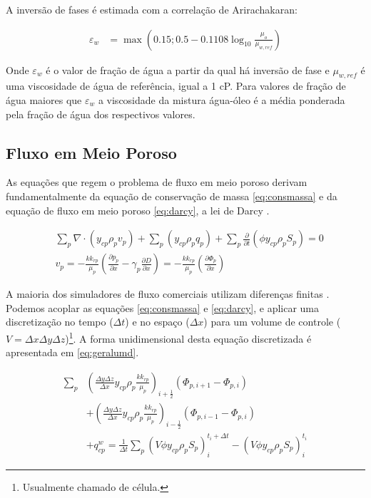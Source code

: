 \documentclass[final,5p]{elsarticle}
\numberwithin{equation}{section}
\begin{document}
        A inversão de fases é estimada com a correlação de Arirachakaran\cite{10.2118/18836-MS}:

        \begin{align}
            \varepsilon_w &= \max \left(0.15; 0.5 - 0.1108 \log_{10} \frac{\mu_o}{\mu_{w,ref}}\right)
        \end{align}

        Onde $\varepsilon_w$ é o valor de fração de água a partir da qual há inversão de fase e $\mu_{w,ref}$ é uma viscosidade de água de referência, igual a 1 cP. Para valores de fração de água maiores que $\varepsilon_w$ a viscosidade da mistura água-óleo é a média ponderada pela fração de água dos respectivos valores.

    \subsection{Fluxo em Meio Poroso}

        As equações que regem o problema de fluxo em meio poroso derivam fundamentalmente da equação de conservação de massa \ref{eq:consmassa} e da equação de fluxo em meio poroso \ref{eq:darcy}, a lei de Darcy \cite{dake1983fundamentals}.

        \begin{align}
            &\sum_{p} \nabla \cdot  (y_{cp} \rho_p v_p) + \sum_{p} (y_{cp} \rho_p q_p) + \sum_{p} \frac{\partial}{\partial t} \left( \phi y_{cp} \rho_p S_p\right) = 0 \label{eq:consmassa} \\
            &v_p = - \frac{k k_{rp}}{\mu_p} \left( \frac{\partial p_p}{\partial x} - \gamma_p \frac{\partial D}{\partial x} \right) = - \frac{k k_{rp}}{\mu_p} \left( \frac{\partial \Phi_p}{\partial x} \right)\label{eq:darcy}
        \end{align}

        A maioria dos simuladores de fluxo comerciais utilizam diferenças finitas \cite{computer2022cmg}\cite{schlumberger2009technical}. Podemos acoplar as equações \ref{eq:consmassa} e \ref{eq:darcy}, e aplicar uma discretização no tempo ($\Delta t$) e no espaço ($\Delta x$) para um volume de controle ($V = \Delta x \Delta y \Delta z$)\footnote{Usualmente chamado de célula.}. A forma unidimensional desta equação discretizada é apresentada em \ref{eq:geralumd}.

        \begin{align}
            \sum_{p} & \left( \frac{\Delta y \Delta z}{\Delta x} y_{cp} \rho_p \frac{k k_{rp}}{\mu_p} \right)_{i+\tfrac{1}{2}} (\Phi_{p,i+1} - \Phi_{p,i})  \nonumber \\
            & + \left( \frac{\Delta y \Delta z}{\Delta x} y_{cp} \rho_p \frac{k k_{rp}}{\mu_p} \right)_{i-\tfrac{1}{2}} (\Phi_{p,i-1} - \Phi_{p,i}) \nonumber \\
            & + q_{cp}^{w} = \frac{1}{\Delta t} \sum_{p} (V \phi y_{cp} \rho_p S_p)_i^{t_i+\Delta t} - (V \phi y_{cp} \rho_p S_p)_i^{t_i} \label{eq:geralumd}
        \end{align}
\end{document}
